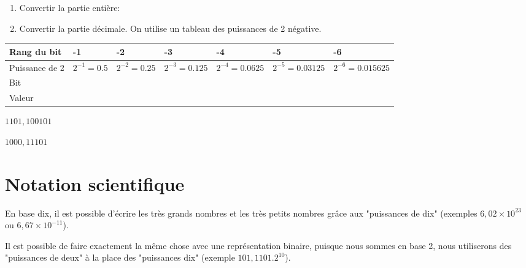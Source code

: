 \begin{exercice_cours}{}

	
\begin{enumerate}
	\item Convertir la partie entière: \dotfill
	\item Convertir la partie décimale. On utilise un tableau des puissances de 2 négative.
\end{enumerate}
	
\renewcommand{\arraystretch}{1.3}
\begin{footnotesize}
\begin{tabular}{|p{2.1cm}|p{1.8cm}|p{1.9cm}|p{2.2cm}|p{2.4cm}|p{2.5cm}|p{2.5cm}|}
\hline
Rang du bit & -1 & -2 & -3 & -4 & -5 & -6  \\ \hline
Puissance de 2 & $2^{-1}=0.5$ & $2^{-2}=0.25$ & $2^{-3}=0.125$ & $2^{-4}=0.0625$ & $2^{-5}=0.03125$ & $2^{-6}=0.015625$  \\ \hline
Bit &  &  &  &  &  &   \\ \hline
Valeur &  &   &   &  &  &  \\ \hline

\end{tabular}
\end{footnotesize}
\end{exercice_cours}

\begin{exercice_cours}{}
\begin{multicols}{2}

$1101,100101$

\columnbreak

$1000,11101$

\end{multicols}

\vspace{1cm}
\end{exercice_cours}

\section{Notation scientifique}


En base dix, il est possible d'écrire les très grands nombres et les très petits nombres grâce aux "puissances de dix" (exemples $6,02\times 10^{23}$ ou $6,67 \times 10^{-11}$). 

Il est possible de faire exactement la même chose avec une représentation binaire, puisque nous sommes en base 2, nous utiliserons des "puissances de deux" à la place des "puissances dix" (exemple $101,1101 .  2^{10}$).

